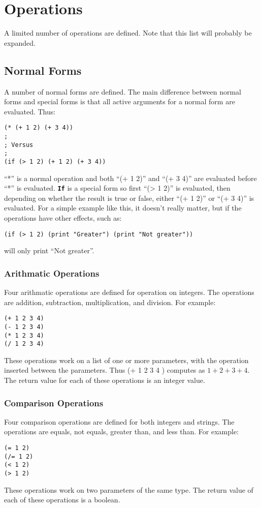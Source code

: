 \documentclass[10pt, openany]{book}
\newcommand{\operation}[1]{\textbf{\texttt{#1}}}
\begin{document}
\section{Operations}
A limited number of operations are defined.  Note that this list will probably be expanded.
\subsection{Normal Forms}
A number of normal forms are defined.  The main difference between normal forms and special forms is that all active arguments for a normal form are evaluated.  Thus:
\begin{lstlisting}
(* (+ 1 2) (+ 3 4))
;
; Versus
;
(if (> 1 2) (+ 1 2) (+ 3 4))
\end{lstlisting}
``*'' is a normal operation and both ``(+ 1 2)'' and ``(+ 3 4)'' are evaluated before ``*'' is evaluated.  \operation{If} is a special form so first ``(> 1 2)'' is evaluated, then depending on whether the result is true or false, either ``(+ 1 2)'' or ``(+ 3 4)'' is evaluated.  For a simple example like this, it doesn't really matter, but if the operations have other effects, such as:
\begin{lstlisting}
(if (> 1 2) (print "Greater") (print "Not greater"))
\end{lstlisting}
will only print ``Not greater''.

\subsubsection{Arithmatic Operations}
Four arithmatic operations are defined for operation on integers.  The operations are addition, subtraction, multiplication, and division.  For example:
\begin{lstlisting}
(+ 1 2 3 4)
(- 1 2 3 4)
(* 1 2 3 4)
(/ 1 2 3 4)
\end{lstlisting}
These operations work on a list of one or more parameters, with the operation inserted between the parameters.  Thus (+ 1 2 3 4 ) computes as $1+2+3+4$.  The return value for each of these operations is an integer value.

\subsubsection{Comparison Operations}
Four comparison operations are defined for both integers and strings.  The operations are equals, not equals, greater than, and less than.  For example:
\begin{lstlisting}
(= 1 2)
(/= 1 2)
(< 1 2)
(> 1 2)
\end{lstlisting}
These operations work on two parameters of the same type.  The return value of each of these operations is a boolean.
\end{document}

